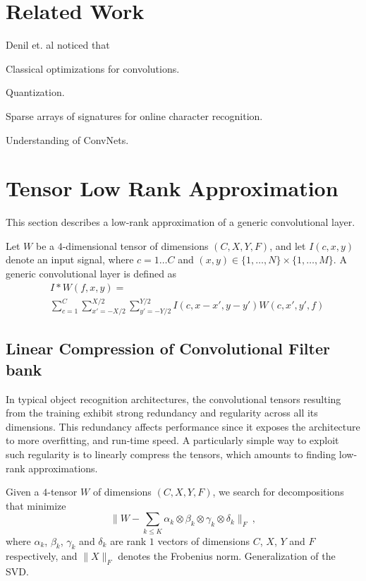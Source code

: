 \documentclass{article}
\begin{document}
\section{Related Work}


Denil et. al \cite{denil2013predicting} noticed that 

Classical optimizations for convolutions. 

Quantization.

Sparse arrays of signatures for online character
recognition.

Understanding of ConvNets. 


\section{Tensor Low Rank Approximation}

This section describes a low-rank approximation of a generic 
convolutional layer. 

Let $W$ be a $4$-dimensional tensor of dimensions $(C,X,Y,F)$,
and let $I(c,x,y)$ denote an input signal, 
where $c=1\dots C$ and $(x,y) \in \{1,\dots,N\}\times \{1,\dots,M\}$.
A generic convolutional layer is defined as
\begin{align*}
\label{convlayereq}
&I \ast W (f,x,y) = \\
&\sum_{c=1}^C \sum_{x'=-X/2}^{X/2} \sum_{y'=-Y/2}^{Y/2} I(c,x-x',y-y') W(c,x',y',f)
\end{align*}

\subsection{Linear Compression of Convolutional Filter bank}

In typical object recognition architectures, the convolutional tensors resulting
from the training exhibit strong redundancy and regularity across all its 
dimensions. This redundancy affects performance since it exposes
the architecture to more overfitting, and run-time speed. 
A particularly simple way to exploit such regularity is to 
linearly compress the tensors, which amounts to finding low-rank 
approximations.

Given a $4$-tensor $W$ of dimensions $(C,X,Y,F)$, we search for decompositions 
that minimize 
\begin{equation}
\label{rankoptim}
\| W - \sum_{k\leq K} \alpha_k \otimes \beta_k \otimes \gamma_k \otimes \delta_k\|_F~,
\end{equation}
where $\alpha_k$, $\beta_k$, $\gamma_k$ and $\delta_k$ are 
rank $1$ vectors of dimensions $C$, $X$, $Y$ and $F$ respectively, and
$\| X \|_F$ denotes the Frobenius norm. Generalization of the SVD.
\end{document}
